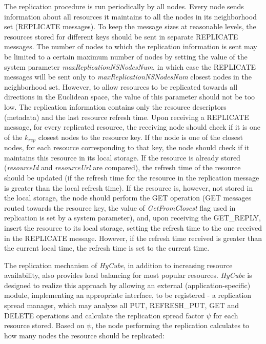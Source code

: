 The replication procedure is run periodically by all nodes. Every node sends information about all resources it maintains to all the nodes in its neighborhood set (REPLICATE messages). To keep the message sizes at reasonable levels, the resources stored for different keys should be sent in separate REPLICATE messages. The number of nodes to which the replication information is sent may be limited to a certain maximum number of nodes by setting the value of the system parameter \emph{maxReplicationNSNodesNum}, in which case the REPLICATE messages will be sent only to \emph{maxReplicationNSNodesNum} closest nodes in the neighborhood set. However, to allow resources to be replicated towards all directions in the Euclidean space, the value of this parameter should not be too low. The replication information contains only the resource descriptors (metadata) and the last resource refresh time. Upon receiving a REPLICATE message, for every replicated resource, the receiving node should check if it is one of the $k_{rep}$ closest nodes to the resource key. If the node is one of the closest nodes, for each resource corresponding to that key, the node should check if it maintains this resource in its local storage. If the resource is already stored (\emph{resourceId} and \emph{resourceUrl} are compared), the refresh time of the resource should be updated (if the refresh time for the resource in the replication message is greater than the local refresh time). If the resource is, however, not stored in the local storage, the node should perform the GET operation (GET messages routed towards the resource key, the value of \emph{GetFromClosest} flag used in replication is set by a system parameter), and, upon receiving the GET\_REPLY, insert the resource to its local storage, setting the refresh time to the one received in the REPLICATE message. However, if the refresh time received is greater than the current local time, the refresh time is set to the current time.

The replication mechanism of \emph{HyCube}, in addition to increasing resource availability, also provides load balancing for most popular resources. \emph{HyCube} is designed to realize this approach by allowing an external (application-specific) module, implementing an appropriate interface, to be registered - a replication spread manager, which may analyze all PUT, REFRESH\_PUT, GET and DELETE operations and calculate the replication spread factor $\psi$ for each resource stored. Based on $\psi$, the node performing the replication calculates to how many nodes the resource should be replicated:

